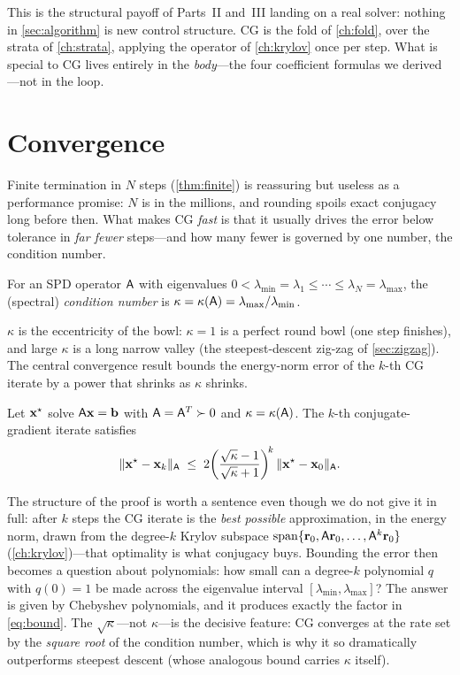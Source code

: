 This is the structural payoff of Parts~II and~III landing on a real solver:
nothing in \cref{sec:algorithm} is new control structure. CG is the fold of
\cref{ch:fold}, over the strata of \cref{ch:strata}, applying the operator of
\cref{ch:krylov} once per step. What is special to CG lives entirely in the
\emph{body}---the four coefficient formulas we derived---not in the loop.

\section{Convergence}
\label{sec:converge}

Finite termination in $N$ steps (\cref{thm:finite}) is reassuring but useless as a
performance promise: $N$ is in the millions, and rounding spoils exact conjugacy
long before then. What makes CG \emph{fast} is that it usually drives the error
below tolerance in \emph{far fewer} steps---and how many fewer is governed by one
number, the condition number.

\begin{definition}
\label{def:kappa}
For an SPD operator $\mathsf{A}$ with eigenvalues
$0<\lambda_{\min}=\lambda_1\le\cdots\le\lambda_N=\lambda_{\max}$, the (spectral)
\emph{condition number} is
$\kappa=\kappa(\mathsf{A})=\lambda_{\max}/\lambda_{\min}$.
\end{definition}

$\kappa$ is the eccentricity of the bowl: $\kappa=1$ is a perfect round bowl (one
step finishes), and large $\kappa$ is a long narrow valley (the steepest-descent
zig-zag of \cref{sec:zigzag}). The central convergence result bounds the
energy-norm error of the $k$-th CG iterate by a power that shrinks as $\kappa$
shrinks.

\begin{theorem}
\label{thm:converge}
Let $\mathbf{x}^\star$ solve $\mathsf{A}\mathbf{x}=\mathbf{b}$ with $\mathsf{A}=\mathsf{A}^{T}\succ0$ and
$\kappa=\kappa(\mathsf{A})$. The $k$-th conjugate-gradient iterate satisfies
\begin{equation}
\label{eq:bound}
  \lVert\mathbf{x}^\star-\mathbf{x}_k\rVert_{\mathsf{A}}
  \;\le\; 2\!\left(\frac{\sqrt{\kappa}-1}{\sqrt{\kappa}+1}\right)^{\!k}
  \lVert\mathbf{x}^\star-\mathbf{x}_0\rVert_{\mathsf{A}} .
\end{equation}
\end{theorem}

The structure of the proof is worth a sentence even though we do not give it in
full: after $k$ steps the CG iterate is the \emph{best possible} approximation, in
the energy norm, drawn from the degree-$k$ Krylov subspace
$\operatorname{span}\{\mathbf{r}_0,\mathsf{A}\mathbf{r}_0,\dots,\mathsf{A}^{k}\mathbf{r}_0\}$
(\cref{ch:krylov})---that optimality is what conjugacy buys. Bounding the error
then becomes a question about polynomials: how small can a degree-$k$ polynomial
$q$ with $q(0)=1$ be made across the eigenvalue interval
$[\lambda_{\min},\lambda_{\max}]$? The answer is given by Chebyshev polynomials,
and it produces exactly the factor in \eqref{eq:bound}. The
$\sqrt{\kappa}$---not $\kappa$---is the decisive feature: CG converges at the rate
set by the \emph{square root} of the condition number, which is why it so
dramatically outperforms steepest descent (whose analogous bound carries $\kappa$
itself).

